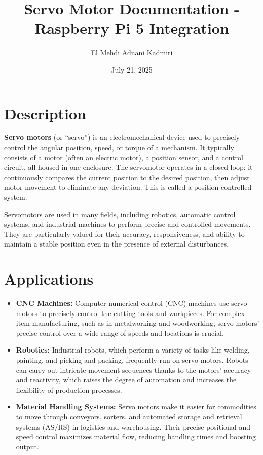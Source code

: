 \documentclass{article}
\title{Servo Motor Documentation - Raspberry Pi 5 Integration}
\author{El Mehdi Adnani Kadmiri}
\date{July 21, 2025}
\begin{document}
		
	\maketitle
	
		\section{Description}
	\textbf{Servo motors}
	(or “servo”) is an electromechanical device used to precisely control the angular position, speed, or torque of a mechanism. It typically consists of a motor (often an electric motor), a position sensor, and a control circuit, all housed in one enclosure.
	The servomotor operates in a closed loop: it continuously compares the current position to the desired position, then adjust motor movement to eliminate any deviation. This is called a position-controlled system.
	
	Servomotors are used in many fields, including robotics, automatic control systems, and industrial machines to perform precise and controlled movements. They are particularly valued for their accuracy, responsiveness, and ability to maintain a stable position even in the presence of external disturbances.

	\section{Applications}
	\begin{itemize}
		\item \textbf{CNC Machines:} Computer numerical control (CNC) machines use servo motors to precisely control the cutting tools and workpieces. For complex item manufacturing, such as in metalworking and woodworking, servo motors' precise control over a wide range of speeds and locations is crucial.
		\item \textbf{Robotics:} Industrial robots, which perform a variety of tasks like welding, painting, and picking and packing, frequently run on servo motors. Robots can carry out intricate movement sequences thanks to the motors' accuracy and reactivity, which raises the degree of automation and increases the flexibility of production processes.
		\item \textbf{	Material Handling Systems:} Servo motors make it easier for commodities to move through conveyors, sorters, and automated storage and retrieval systems (AS/RS) in logistics and warehousing. Their precise positional and speed control maximizes material flow, reducing handling times and boosting output.
	\end{itemize}
	
\end{document}

